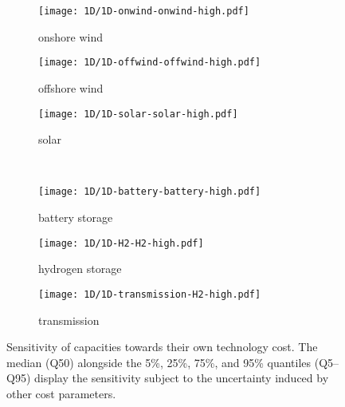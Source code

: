 \begin{figure}
    \begin{subfigure}[t]{0.32\textwidth}
        \caption{onshore wind}
        \texttt{[image: 1D/1D-onwind-onwind-high.pdf]}
    \end{subfigure}
    \begin{subfigure}[t]{0.32\textwidth}
        \caption{offshore wind}
        \texttt{[image: 1D/1D-offwind-offwind-high.pdf]}
    \end{subfigure}
    \begin{subfigure}[t]{0.32\textwidth}
        \caption{solar}
        \texttt{[image: 1D/1D-solar-solar-high.pdf]}
    \end{subfigure} \\
    \begin{subfigure}[t]{0.32\textwidth}
        \caption{battery storage}
        \texttt{[image: 1D/1D-battery-battery-high.pdf]}
    \end{subfigure}
    \begin{subfigure}[t]{0.32\textwidth}
        \caption{hydrogen storage}
        \texttt{[image: 1D/1D-H2-H2-high.pdf]}
    \end{subfigure}
    \begin{subfigure}[t]{0.32\textwidth}
        \caption{transmission}
        \texttt{[image: 1D/1D-transmission-H2-high.pdf]}
    \end{subfigure}
    \caption{
      Sensitivity of capacities towards their own technology cost.
      The median (Q50) alongside the 5\%, 25\%, 75\%, and 95\% quantiles (Q5--Q95) display
      the sensitivity subject to the uncertainty induced by other cost parameters.
    }
    \label{fig:sensitivity}
\end{figure}

